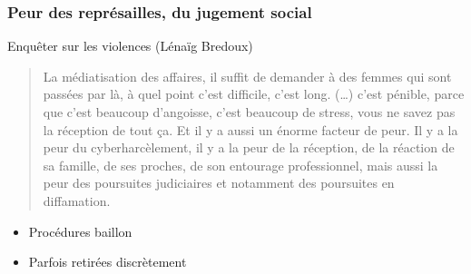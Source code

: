 \documentclass[french]{beamer}
\begin{document}
\begin{frame}
  \frametitle{Peur des représailles, du jugement social}
  \begin{block}{Enquêter sur les violences (Lénaïg Bredoux)}
    \begin{quote}
      La médiatisation des affaires, il suffit de demander à des femmes qui sont passées par là, à quel point c’est difficile, c’est long. (…) c’est pénible, parce que c’est beaucoup d’angoisse, c’est beaucoup de stress, vous ne savez pas la réception de tout ça. Et il y a aussi un énorme facteur de peur. Il y a la peur du cyberharcèlement, il y a la peur de la réception, de la réaction de sa famille, de ses proches, de son entourage professionnel, mais aussi la peur des poursuites judiciaires et notamment des poursuites en diffamation.
    \end{quote}
  \end{block}
  \begin{itemize}
    \item Procédures \og{}baillon\fg{}
    \item Parfois retirées discrètement
  \end{itemize}
\end{frame}
\end{document}
